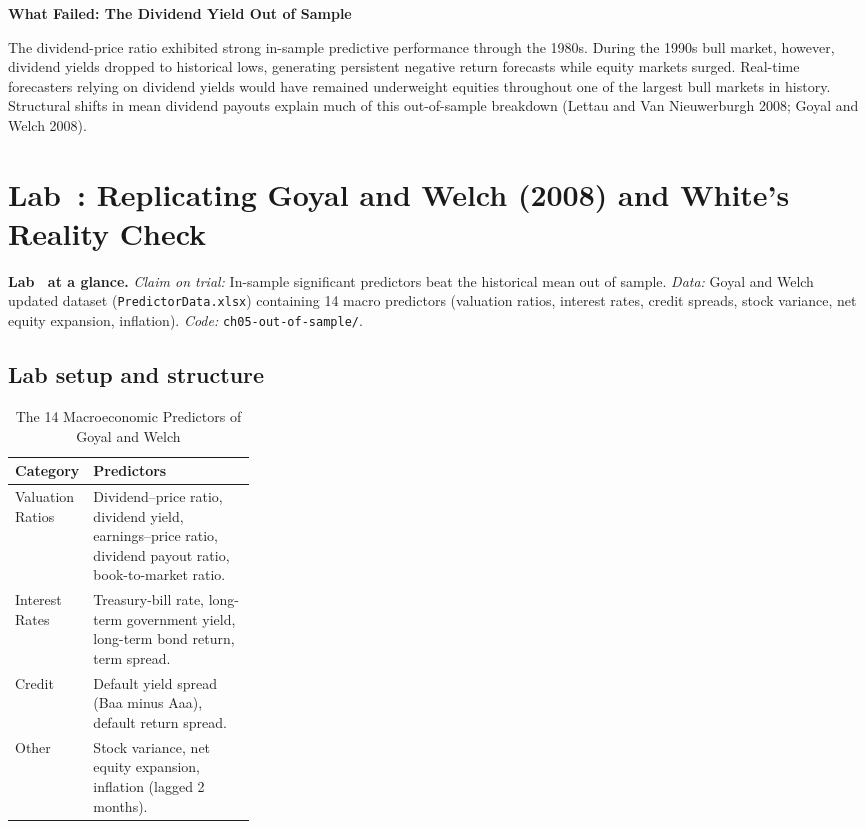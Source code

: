 \begin{callout}
\noindent \textbf{What Failed: The Dividend Yield Out of Sample}

The dividend-price ratio exhibited strong in-sample predictive performance through the 1980s. During the 1990s bull market, however, dividend yields dropped to historical lows, generating persistent negative return forecasts while equity markets surged. Real-time forecasters relying on dividend yields would have remained underweight equities throughout one of the largest bull markets in history. Structural shifts in mean dividend payouts explain much of this out-of-sample breakdown (Lettau and Van Nieuwerburgh 2008; Goyal and Welch 2008).
\end{callout}

\section{Lab~\thechapter: Replicating Goyal and Welch (2008) and White's Reality Check}
\label{sec:08-lab}

\begin{callout}
\noindent \textbf{Lab~\thechapter{} at a glance.} \emph{Claim on trial:} In-sample significant predictors beat the historical mean out of sample. \emph{Data:} Goyal and Welch updated dataset (\texttt{PredictorData.xlsx}) containing 14 macro predictors (valuation ratios, interest rates, credit spreads, stock variance, net equity expansion, inflation). \emph{Code:} \texttt{ch05-out-of-sample/}.
\end{callout}

\subsection*{Lab setup and structure}
\begin{table}[htbp]
\centering
\small
\caption{The 14 Macroeconomic Predictors of Goyal and Welch}
\label{tab:08-goyal-predictors}
\begin{tabularx}{0.95\linewidth}{@{}>{\raggedright\arraybackslash}p{0.28\linewidth}>{\raggedright\arraybackslash}X@{}}
\toprule
Category & Predictors \\
\midrule
Valuation Ratios & Dividend--price ratio, dividend yield, earnings--price ratio, dividend payout ratio, book-to-market ratio. \\
Interest Rates & Treasury-bill rate, long-term government yield, long-term bond return, term spread. \\
Credit & Default yield spread (Baa minus Aaa), default return spread. \\
Other & Stock variance, net equity expansion, inflation (lagged 2 months). \\
\bottomrule
\end{tabularx}
\end{table}

